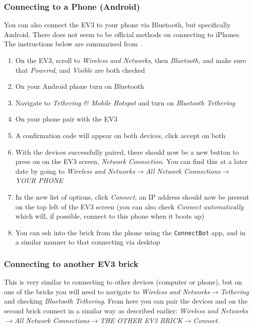 \documentclass{article}
\begin{document}
\subsubsection{Connecting to a Phone (Android)}
You can also connect the EV3 to your phone via Bluetooth, but specifically Android. There does not seem to be official methods on connecting to iPhones. The instructions below are summarised from~\cite{connectPhone}.

\begin{enumerate}
    \item On the EV3, scroll to \textit{Wireless and Networks}, then \textit{Bluetooth}, and make sure that \textit{Powered}, and \textit{Visible} are both checked
    \item On your Android phone turn on Bluetooth
    \item Navigate to \textit{Tethering \& Mobile Hotspot} and turn on \textit{Bluetooth Tethering}
    \item On your phone pair with the EV3
    \item A confirmation code will appear on both devices, click accept on both
    \item With the devices successfully paired, there should now be a new button to press on on the EV3 screen, \textit{Network Connection}. You can find this at a later date by going to \textit{Wireless and Networks}\(\rightarrow\)\textit{All Network Connections}\(\rightarrow\)\textit{YOUR PHONE}
    \item In the new list of options, click \textit{Connect}, an IP address should now be present on the top left of the EV3 screen (you can also check \textit{Connect automatically} which will, if possible, connect to this phone when it boots up)
    \item You can ssh into the brick from the phone using the \texttt{ConnectBot} app, and in a similar manner to that connecting via desktop
\end{enumerate}

\subsubsection{Connecting to another EV3 brick}
This is very similar to connecting to other devices (computer or phone), but on one of the bricks you will need to navigate to \textit{Wireless and Networks}\(\rightarrow\)\textit{Tethering} and checking \textit{Bluetooth Tethering}. From here you can pair the devices and on the second brick connect in a similar way as described earlier: \textit{Wireless and Networks}\(\rightarrow\)\textit{All Network Connections}\(\rightarrow\)\textit{THE OTHER EV3 BRICK}\(\rightarrow\)\textit{Connect}.
\end{document}
